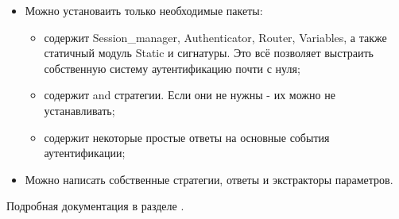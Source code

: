 \begin{itemize}\item{Можно установаить только необходимые пакеты:

\begin{itemize}\item{ содержит Session\_manager, Authenticator, Router, Variables, а также статичный модуль Static и сигнатуры. Это всё позволяет выстраить собственную систему аутентификацию почти с нуля;}%
\item{ содержит  and  стратегии. Если они не нужны - их можно не устанавливать;}%
\item{ содержит некоторые простые ответы на основные события аутентификации;}\end{itemize}%
}%
\item{Можно написать собственные стратегии, ответы и экстракторы параметров.}\end{itemize}%
Подробная документация в разделе \hyperref[page-FPauth-module-FPauth]{}{}.%


